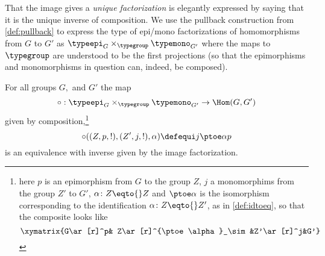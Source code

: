 That the image gives a \emph{unique factorization} is elegantly expressed by saying that it is the unique inverse of composition.
We use the pullback construction from \cref{def:pullback} to express the type of epi/mono factorizations of homomorphisms from $G$ to $G'$ as $\typeepi_G\times_{\typegroup}\typemono_{G'}$ where the maps to $\typegroup$ are understood to be the first projections
(so that the epimorphisms and monomorphisms in question can, indeed, be composed).


  \begin{construction}\label{con:im}
    For all groups $G,$ and $G'$ the map
    $$
    \circ:\typeepi_G\times_{\typegroup}\typemono_{G'}\to\Hom(G,G')
    $$
    given by composition,\footnote{here $p$ is an epimorphism from $G$ to the group $Z$, $j$ a monomorphims from the group $Z'$ to $G'$, $\alpha\colon Z\eqto{}Z$
      and $\ptoe\alpha$ is the isomorphism corresponding to the identification $\alpha\colon Z\eqto{}Z'$, as in \cref{def:idtoeq},
      so that the composite looks like
    $$\xymatrix{G\ar[r]^p& Z\ar[r]^{\ptoe\alpha}_\sim&Z'\ar[r]^j&G'}$$}
    $$\circ((Z,p,!),(Z',j,!),\alpha)\defequi j\ptoe \alpha p$$
    is an equivalence
    with inverse given by the image factorization.
\end{construction}
